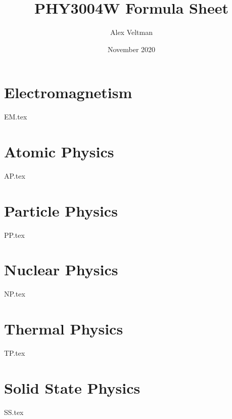 \documentclass[a4paper, twocolumn]{article}
\title{PHY3004W Formula Sheet}
\author{Alex Veltman}
\date{November 2020}
\makeatletter
\numberwithin{equation}{section}
\renewcommand{\maketitle} %
{ \begingroup \vskip 10pt \begin{center} \large {\bf \@title}
	\vskip 10pt \large \@author \hskip 20pt \@date \end{center}
  \vskip 10pt \endgroup \setcounter{footnote}{0} }
\makeatother
\begin{document}
\maketitle
\section{Electromagnetism}
{EM.tex}

\section{Atomic Physics}
{AP.tex}

\section{Particle Physics}
{PP.tex}

\section{Nuclear Physics}
{NP.tex}

\section{Thermal Physics}
{TP.tex}

\section{Solid State Physics}
{SS.tex}
\end{document}
